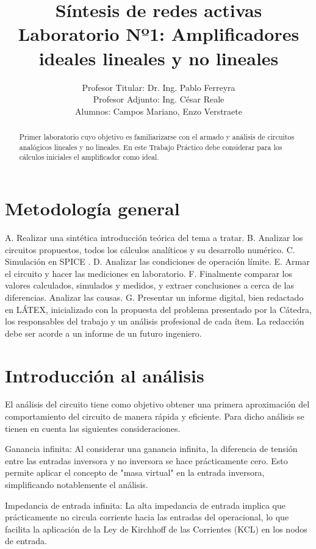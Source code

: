 \documentclass[12pt]{article}
\title{Síntesis de redes activas \\ Laboratorio Nº1: Amplificadores ideales lineales y no lineales}
\author{Profesor Titular: Dr. Ing. Pablo Ferreyra \\  Profesor Adjunto: Ing. César Reale \\ Alumnos: Campos Mariano, 
		Enzo Verstraete}
\begin{document}
	\maketitle
	
	\begin{abstract}
		Primer laboratorio cuyo objetivo es familiarizarse con el armado y análisis de circuitos analógicos
		lineales y no lineales. En este Trabajo Práctico debe considerar para los cálculos iniciales el 
		amplificador como ideal.
	\end{abstract}
	
	
	\section{Metodología general}	
		A. Realizar una sintética introducción teórica del tema a tratar.
		B. Analizar los circuitos propuestos, todos los cálculos analíticos y su desarrollo numérico.
		C. Simulación en SPICE .
		D. Analizar las condiciones de operación límite.
		E. Armar el circuito y hacer las mediciones en laboratorio.
		F. Finalmente comparar los valores calculados, simulados y medidos, y extraer conclusiones a
		cerca de las diferencias. Analizar las causas.
		G. Presentar un informe digital, bien redactado en LÁTEX, inicializado con la propuesta del
		problema presentado por la Cátedra, los responsables del trabajo y un análisis profesional de
		cada ítem. La redacción debe ser acorde a un informe de un futuro ingeniero.
	
	\section{Introducción al análisis}
	
	El análisis del	circuito tiene como objetivo obtener una primera aproximación del comportamiento
	del circuito de manera rápida y eficiente. Para dicho análisis se tienen en cuenta las siguientes
	consideraciones.
	
	Ganancia infinita: Al considerar una ganancia infinita, la diferencia de tensión entre las entradas inversora y no inversora se hace prácticamente cero. Esto permite aplicar el concepto de "masa virtual" en la entrada inversora, simplificando notablemente el análisis.
	
	Impedancia de entrada infinita: La alta impedancia de entrada implica que prácticamente no circula corriente hacia las entradas del operacional, lo que facilita la aplicación de la Ley de Kirchhoff de las Corrientes (KCL) en los nodos de entrada.
	
\end{document}
